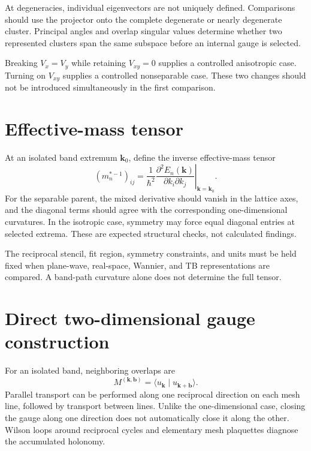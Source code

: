 At degeneracies, individual eigenvectors are not uniquely defined. Comparisons
should use the projector onto the complete degenerate or nearly degenerate
cluster. Principal angles and overlap singular values determine whether two
represented clusters span the same subspace before an internal gauge is
selected.

Breaking $V_x=V_y$ while retaining $V_{xy}=0$ supplies a controlled anisotropic
case. Turning on $V_{xy}$ supplies a controlled nonseparable case. These two
changes should not be introduced simultaneously in the first comparison.

\section{Effective-mass tensor}


At an isolated band extremum $\mathbf k_0$, define the inverse effective-mass
tensor
\begin{equation}
    \left(m_n^{\ast-1}\right)_{ij}
    =
    \frac{1}{\hbar^2}
    \left.
        \frac{\partial^2E_n(\mathbf k)}
        {\partial k_i\partial k_j}
    \right|_{\mathbf k=\mathbf k_0}.
\end{equation}
For the separable parent, the mixed derivative should vanish in the lattice
axes, and the diagonal terms should agree with the corresponding
one-dimensional curvatures. In the isotropic case, symmetry may force equal
diagonal entries at selected extrema. These are expected structural checks,
not calculated findings.

The reciprocal stencil, fit region, symmetry constraints, and units must be
held fixed when plane-wave, real-space, Wannier, and TB representations are
compared. A band-path curvature alone does not determine the full tensor.

\section{Direct two-dimensional gauge construction}

For an isolated band, neighboring overlaps are
\begin{equation}
    M^{(\mathbf k,\mathbf b)}
    =
    \langle
        u_{\mathbf k}
        \mid
        u_{\mathbf k+\mathbf b}
    \rangle.
\end{equation}
Parallel transport can be performed along one reciprocal direction on each
mesh line, followed by transport between lines. Unlike the one-dimensional
case, closing the gauge along one direction does not automatically close it
along the other. Wilson loops around reciprocal cycles and elementary mesh
plaquettes diagnose the accumulated holonomy.

